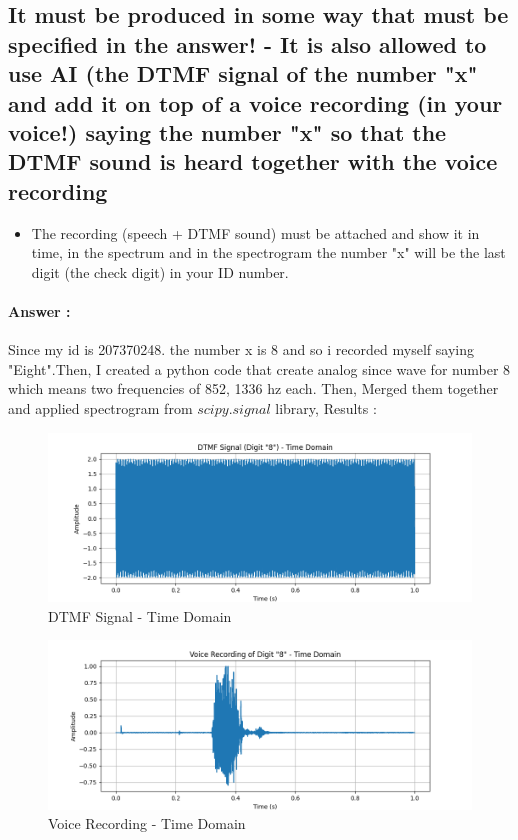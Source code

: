 \documentclass[letterpaper, 12pt]{article}
\begin{document}
\subsection{It must be produced in some way that must be specified in the answer! - It is also allowed to use AI (the DTMF signal of the number "x" and add it on top of a voice recording (in your voice!) saying the number "x" so that the DTMF sound is heard together with the voice recording }
\begin{itemize}
    \item The recording (speech + DTMF sound) must be attached and show it in time, in the spectrum and in the spectrogram the number "x" will be the last digit (the check digit) in your ID number.
\end{itemize}

\paragraph{Answer :} 
Since my id is 207370248. the number x is 8 and so i recorded myself saying "Eight".Then, I created a python code that create analog since wave for number 8 which means two frequencies of 852, 1336 hz each. Then, Merged them together and applied spectrogram from $scipy.signal$ library, Results :\\

\begin{figure}[htbp]
    \centering
    \caption{DTMF Signal - Time Domain}
    \includegraphics[width=0.75\linewidth]{FINAL_ASSIGNMENT/DTMF Signal - Time Domain.png}
    
    
\end{figure}

\begin{figure}[htbp]
    \centering
        \caption{Voice Recording - Time Domain}

    \includegraphics[width=0.75\linewidth]{FINAL_ASSIGNMENT/Voice Recording - Time Domain.png}
    
\end{figure}
\end{document}
